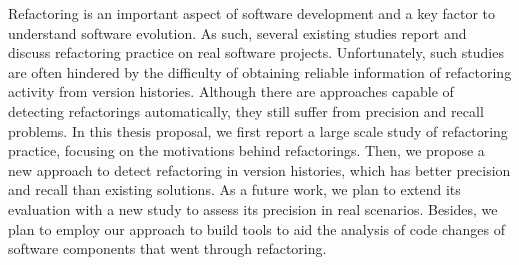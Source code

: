 

Refactoring is an important aspect of software development and a key factor to understand software evolution.
As such, several existing studies report and discuss refactoring practice on real software projects.
Unfortunately, such studies are often hindered by the difficulty of obtaining reliable information of refactoring activity from version histories.
Although there are approaches capable of detecting refactorings automatically, they still suffer from precision and recall problems.
In this thesis proposal, we first report a large scale study of refactoring practice, focusing on the motivations behind refactorings.
Then, we propose a new approach to detect refactoring in version histories, which has better precision and recall than existing solutions.
As a future work, we plan to extend its evaluation with a new study to assess its precision in real scenarios. 
Besides, we plan to employ our approach to build tools to aid the analysis of code changes of software components that went through refactoring.



